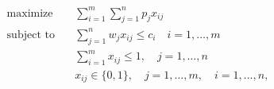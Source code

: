 \begin{align*}
\text{maximize} \quad & \sum_{i=1}^m \sum_{j=1}^n p_j x_{ij} \\
\text{subject to} \quad & \sum_{j=1}^n w_j x_{ij} \leq c_i \quad i = 1, \ldots, m \\
& \sum_{i=1}^m x_{ij} \leq 1, \quad j = 1, \ldots, n \\
& x_{ij} \in \lbrace 0, 1 \rbrace, \quad j = 1, \ldots,m, \quad i = 1, \ldots, n,
\end{align*}


